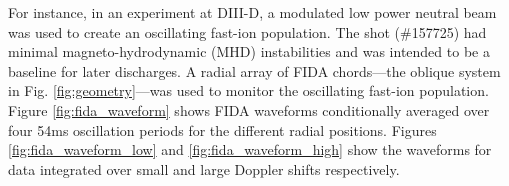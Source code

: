 For instance, in an experiment at DIII-D, a modulated low power neutral beam was used to create an oscillating fast-ion population. The shot (\#157725) had minimal magneto-hydrodynamic (MHD) instabilities and was intended to be a baseline for later discharges. A radial array of FIDA chords---the oblique system in Fig. \ref{fig:geometry}---was used to monitor the oscillating fast-ion population. Figure \ref{fig:fida_waveform} shows FIDA waveforms conditionally averaged over four 54ms oscillation periods for the different radial positions. Figures \ref{fig:fida_waveform_low} and \ref{fig:fida_waveform_high} show the waveforms for data integrated over small and large Doppler shifts respectively. 
\begin{figure}[ht]
    \centering
    \hspace{2pt}

\end{figure}
